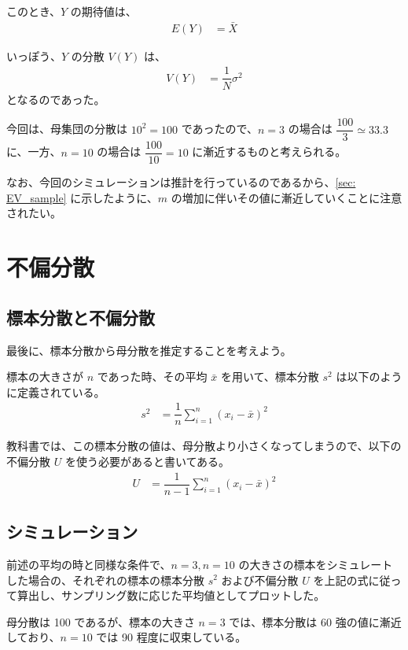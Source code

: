 \documentclass[uplatex,11pt,a4paper]{jsarticle}
\begin{document}
このとき、$Y$ の期待値は、
\begin{align*}
E(Y)
	&= \bar{X}
\end{align*}

いっぽう、$Y$ の分散 $V(Y)$ は、
\begin{align*}
V(Y)
	&= \dfrac{1}{N} \sigma^2
\end{align*}
となるのであった。

今回は、母集団の分散は $10^2=100$ であったので、$n=3$ の場合は $\dfrac{100}{3} \simeq 33.3$ に、一方、$n=10$ の場合は $\dfrac{100}{10} = 10$ に漸近するものと考えられる。

なお、今回のシミュレーションは推計を行っているのであるから、\ref{sec: EV_sample} に示したように、$m$ の増加に伴いその値に漸近していくことに注意されたい。

\newpage

\section{不偏分散}

\subsection{標本分散と不偏分散}

最後に、標本分散から母分散を推定することを考えよう。

標本の大きさが $n$ であった時、その平均 $\bar{x}$ を用いて、標本分散 $s^2$ は以下のように定義されている。
\begin{align*}
s^2
	&=\dfrac{1}{n} \sum_{i=1}^n (x_i-\bar{x})^2
\end{align*}

教科書では、この標本分散の値は、母分散より小さくなってしまうので、以下の不偏分散 $U$ を使う必要があると書いてある。
\begin{align*}
U
	&=\dfrac{1}{n-1} \sum_{i=1}^n (x_i-\bar{x})^2
\end{align*}

\subsection{シミュレーション}

前述の平均の時と同様な条件で、$n=3, n=10$ の大きさの標本をシミュレートした場合の、それぞれの標本の標本分散 $s^2$ および不偏分散 $U$ を上記の式に従って算出し、サンプリング数に応じた平均値としてプロットした。

母分散は 100 であるが、標本の大きさ $n=3$ では、標本分散は 60 強の値に漸近しており、$n=10$ では 90 程度に収束している。
\end{document}
